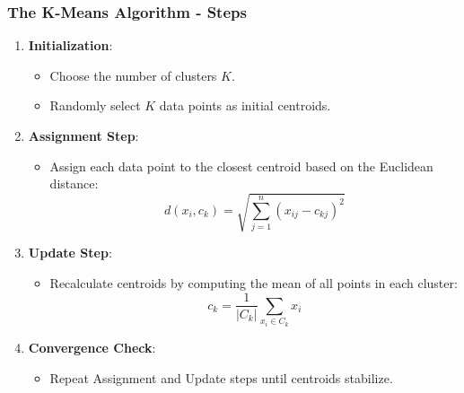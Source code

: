 \documentclass[aspectratio=169]{beamer}
\begin{document}
\begin{frame}[fragile]
    \frametitle{The K-Means Algorithm - Steps}
    \begin{enumerate}
        \item \textbf{Initialization}:
        \begin{itemize}
            \item Choose the number of clusters \( K \).
            \item Randomly select \( K \) data points as initial centroids.
        \end{itemize}
        
        \item \textbf{Assignment Step}:
        \begin{itemize}
            \item Assign each data point to the closest centroid based on the Euclidean distance:
            \begin{equation}
                d(x_i, c_k) = \sqrt{\sum_{j=1}^n (x_{ij} - c_{kj})^2}
            \end{equation}
        \end{itemize}
        
        \item \textbf{Update Step}:
        \begin{itemize}
            \item Recalculate centroids by computing the mean of all points in each cluster:
            \begin{equation}
                c_k = \frac{1}{|C_k|} \sum_{x_i \in C_k} x_i
            \end{equation}
        \end{itemize}
        
        \item \textbf{Convergence Check}:
        \begin{itemize}
            \item Repeat Assignment and Update steps until centroids stabilize.
        \end{itemize}
    \end{enumerate}
\end{frame}
\end{document}
